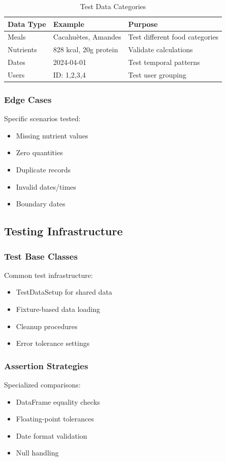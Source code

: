 \begin{table}[h]
    \centering
    \begin{tabular}{|l|l|p{8cm}|}
        \hline
        \textbf{Data Type} & \textbf{Example} & \textbf{Purpose} \\
        \hline
        Meals & Cacahuètes, Amandes & Test different food categories \\
        Nutrients & 828 kcal, 20g protein & Validate calculations \\
        Dates & 2024-04-01 & Test temporal patterns \\
        Users & ID: 1,2,3,4 & Test user grouping \\
        \hline
    \end{tabular}
    \caption{Test Data Categories}
\end{table}

\subsubsection{Edge Cases}
Specific scenarios tested:
\begin{itemize}
    \item Missing nutrient values
    \item Zero quantities
    \item Duplicate records
    \item Invalid dates/times
    \item Boundary dates
\end{itemize}

\subsection{Testing Infrastructure}

\subsubsection{Test Base Classes}
Common test infrastructure:
\begin{itemize}
    \item TestDataSetup for shared data
    \item Fixture-based data loading
    \item Cleanup procedures
    \item Error tolerance settings
\end{itemize}

\subsubsection{Assertion Strategies}
Specialized comparisons:
\begin{itemize}
    \item DataFrame equality checks
    \item Floating-point tolerances
    \item Date format validation
    \item Null handling
\end{itemize}

